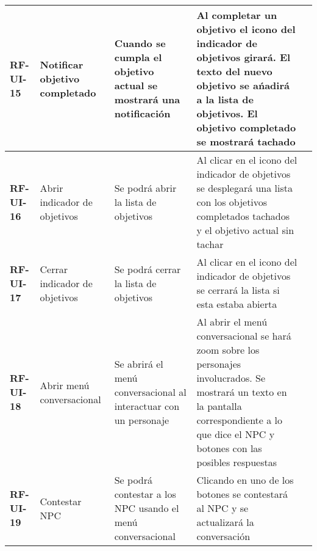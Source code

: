\begin{table}[]
\begin{tabular}{lllll}
\multicolumn{1}{|l|}{\textbf{RF-UI-15}}      & \multicolumn{1}{l|}{Notificar objetivo completado} & \multicolumn{1}{l|}{Cuando se cumpla el objetivo actual se mostrará una notificación}                  & \multicolumn{1}{l|}{Al completar un objetivo el icono del indicador de objetivos girará. El texto del nuevo objetivo se ańadirá a la lista de objetivos. El objetivo completado se mostrará tachado}                                                                  & \multicolumn{1}{l|}{}                   \\ \hline
\multicolumn{1}{|l|}{\textbf{RF-UI-16}}      & \multicolumn{1}{l|}{Abrir indicador de objetivos}  & \multicolumn{1}{l|}{Se podrá abrir la lista de objetivos}                                              & \multicolumn{1}{l|}{Al clicar en el icono del indicador de objetivos se desplegará una lista con los objetivos completados tachados y el objetivo actual sin tachar}                                                                                                  & \multicolumn{1}{l|}{}                   \\ \hline
\multicolumn{1}{|l|}{\textbf{RF-UI-17}}      & \multicolumn{1}{l|}{Cerrar indicador de objetivos} & \multicolumn{1}{l|}{Se podrá cerrar la lista de objetivos}                                             & \multicolumn{1}{l|}{Al clicar en el icono del indicador de objetivos se cerrará la lista si esta estaba abierta}                                                                                                                                                      & \multicolumn{1}{l|}{}                   \\ \hline
\multicolumn{1}{|l|}{\textbf{RF-UI-18}}      & \multicolumn{1}{l|}{Abrir menú conversacional}     & \multicolumn{1}{l|}{Se abrirá el menú conversacional al interactuar con un personaje}                  & \multicolumn{1}{l|}{Al abrir el menú conversacional se hará zoom sobre los personajes involucrados. Se mostrará un texto en la pantalla correspondiente a lo que dice el NPC y botones con las posibles respuestas}                                                   & \multicolumn{1}{l|}{}                   \\ \hline
\multicolumn{1}{|l|}{\textbf{RF-UI-19}}      & \multicolumn{1}{l|}{Contestar NPC}                 & \multicolumn{1}{l|}{Se podrá contestar a los NPC usando el menú conversacional}                        & \multicolumn{1}{l|}{Clicando en uno de los botones se contestará al NPC y se actualizará la conversación}                                                                                                                                                             & \multicolumn{1}{l|}{}                   \\ \hline

\end{tabular}
\end{table}
